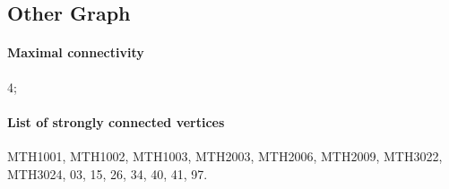 \documentclass[english, 12pt]{article}
\begin{document}
\subsection{Other Graph}
\paragraph{Maximal connectivity} 4;
\parskip=-8.0pt
\paragraph{List of strongly connected vertices} MTH1001, MTH1002, MTH1003, MTH2003, MTH2006, MTH2009, MTH3022, MTH3024, 03, 15, 26, 34, 40, 41, 97.
\parskip=0.0pt
\end{document}
